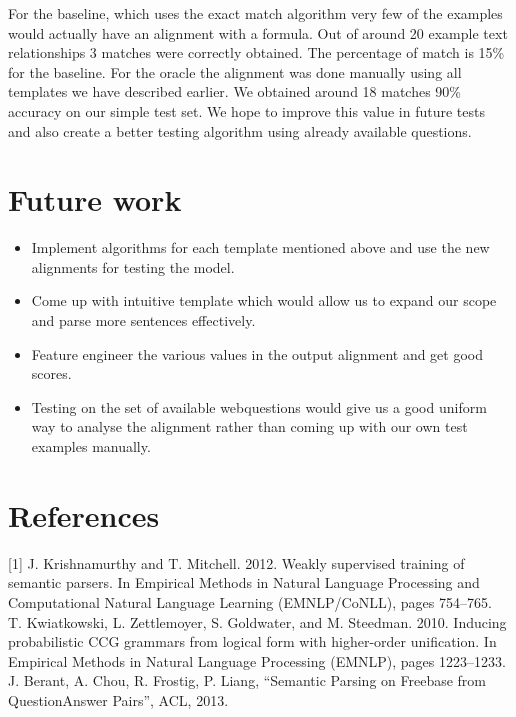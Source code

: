 \documentclass[12pt, a4paper]{article}
\begin{document}
For the baseline, which uses the exact match algorithm very few of the examples would actually have an alignment with a formula. Out of around 20 example text relationships 3 matches were correctly obtained. The percentage of match is 15\% for the baseline. For the oracle the alignment was done manually using all templates we have described earlier. We obtained around 18 matches 90\% accuracy on our simple test set. We hope to improve this value in future tests and also create a better testing algorithm using already available questions. 

\section{Future work}
\begin{itemize}
\item Implement algorithms for each template mentioned above and use the new alignments for testing the model.
\item Come up with intuitive template which would allow us to expand our scope and parse more sentences effectively.
\item Feature engineer the various values in the output alignment and get good scores.
\item Testing on the set of available webquestions would give us a good uniform way to analyse the alignment rather than coming up with our own test examples manually.
\end{itemize}


\section{References}
[1] J. Krishnamurthy and T. Mitchell. 2012. Weakly supervised training of semantic parsers. In Empirical Methods in Natural Language Processing and Computational Natural Language Learning (EMNLP/CoNLL), pages 754–765.\\

\noindent[2] T. Kwiatkowski, L. Zettlemoyer, S. Goldwater, and M. Steedman. 2010. Inducing probabilistic CCG grammars from logical form with higher-order unification. In Empirical Methods in Natural Language Processing (EMNLP), pages 1223–1233.\\

\noindent[3] J. Berant, A. Chou, R. Frostig, P. Liang, “Semantic Parsing on Freebase from QuestionAnswer Pairs”, ACL, 2013.
\end{document}
